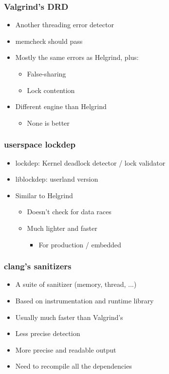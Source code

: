 \begin{frame}
  \frametitle{Valgrind's DRD}

  \begin{itemize}
  \item Another threading error detector
  \item memcheck should pass
  \item Mostly the same errors as Helgrind, plus:
    \begin{itemize}
    \item False-sharing
    \item Lock contention
    \end{itemize}
  \item Different engine than Helgrind
    \begin{itemize}
    \item None is better
    \end{itemize}
  \end{itemize}
\end{frame}


\begin{frame}
  \frametitle{userspace lockdep}

  \begin{itemize}
  \item lockdep: Kernel deadlock detector / lock validator
  \item liblockdep: userland version
  \item Similar to Helgrind
    \begin{itemize}
    \item Doesn't check for data races
    \item Much lighter and faster
      \begin{itemize}
      \item For production / embedded
      \end{itemize}
    \end{itemize}
  \end{itemize}
\end{frame}


\begin{frame}
  \frametitle{clang's sanitizers}

  \begin{itemize}
  \item A suite of sanitizer (memory, thread, ...)
  \item Based on instrumentation and runtime library
  \item Usually much faster than Valgrind's
  \item Less precise detection
  \item More precise and readable output
  \item Need to recompile all the dependencies
  \end{itemize}
\end{frame}

